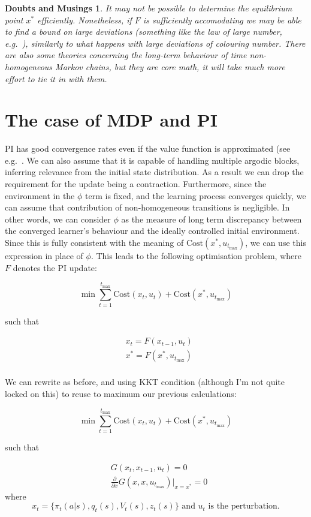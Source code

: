 \documentclass{article}
\newcommand{\ct}{\ensuremath{\mathrm{Cost}(x_t,u_t)}}
\newtheorem{doubt}{Doubts and Musings}
\begin{document}
\begin{doubt}
It may not be possible to determine the equilibrium point $x^*$
efficiently. Nonetheless, if $F$ is sufficiently accomodating we may
be able to find a bound on large deviations (something like the law of large number, e.g.~\cite{liu_liu_94}), similarly to what happens
with large deviations of colouring number. There are also some
theories concerning the long-term behaviour of time non-homogeneous
Markov chains, but they are core math, it will take much more effort
to tie it in with them.
\end{doubt}

\section*{The case of MDP and PI}

PI has good convergence rates even if the value function is
approximated (see e.g.~\cite{bertsekas_book_adp}. We can also assume
that it is capable of handling multiple argodic blocks, inferring
relevance from the initial state distribution. As a result we can drop
the requirement for the update being a contraction. Furthermore, since
the environment in the $\phi$ term is fixed, and the learning process
converges quickly, we can assume that contribution of non-homogeneous
transitions is negligible. In other words, we can consider $\phi$ as
the measure of long term discrepancy between the converged learner's
behaviour and the ideally controlled initial environment. Since this
is fully consistent with the meaning of
$\mathrm{Cost}(x^*,u_{t_{\max}})$, we can use this expression in place
of $\phi$. This leads to the following optimisation problem, where $F$
denotes the PI update:

\[
\min \sum\limits_{t=1}^{t_{\max}}\ct + \mathrm{Cost}(x^*, u_{t_{\max}})
\]
\centerline{such that}
\begin{eqnarray*}
&x_t=F(x_{t-1},u_t)\\
&x^*=F(x^*,u_{t_{\max}})\\
\end{eqnarray*}

We can rewrite as before, and using KKT condition (although I'm not quite locked on this) to reuse to maximum our previous calculations:

\[
\min \sum_{t=1}^{t_{\max}} \ct + \mathrm{Cost}(x^*, u_{t_{\max}})
\]
\centerline{such that}
\begin{eqnarray*}
&G(x_t,x_{t-1},u_t)=0\\
&\frac{\partial}{\partial x}G(x,x,u_{t_{\max}})|_{x=x^*}=0
\end{eqnarray*}
where
\[
x_t=\{\pi_t(a|s),q_t(s),V_{t}(s),z_t(s)\} \mbox{ and $u_t$ is the perturbation.}
\]
\end{document}
